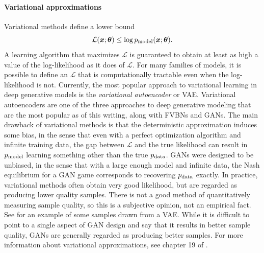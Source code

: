 \paragraph{Variational approximations}
Variational methods define a lower bound
\[ \mathcal{L}({\bm{x}}; {\bm{\theta}}) \leq \log p_{\rm{model}}({\bm{x}}; {\bm{\theta}}). \]
A learning algorithm that maximizes $\mathcal{L}$ is guaranteed to obtain at least
as high a value of the log-likelihood as it does of $\mathcal{L}$.
For many families of models, it is possible to define an $\mathcal{L}$ that is computationally
tractable even when the log-likelihood is not.
Currently, the most popular approach to variational learning in deep generative models
is the {\em variational autoencoder} \citep{Kingma-arxiv2013,Rezende-et-al-ICML2014} or VAE.
Variational autoencoders are one of the three approaches to deep generative modeling that are
the most popular as of this writing, along with FVBNs and GANs.
The main drawback of variational methods is that the deterministic approximation induces some bias,
in the sense that even with a perfect optimization algorithm and infinite training data, the gap
between $\mathcal{L}$ and the true likelihood can result in $p_{\rm{model}}$ learning something other than
the true $p_{\rm{data}}$.
GANs were designed to be unbiased, in the sense that with a large enough model and infinite data,
the Nash equilibrium for a GAN game corresponds to recovering $p_{\rm{data}}$ exactly.
In practice, variational methods often obtain very good likelihood, but are regarded as producing
lower quality samples.
There is not a good method of quantitatively measuring sample quality, so this is a subjective opinion,
not an empirical fact.
See  for an example of some samples drawn from a VAE.
While it is difficult to point to a single aspect of GAN design and say that it results in
better sample quality, GANs are generally regarded as producing better samples.
For more information about variational approximations, see chapter 19 of
\citet{Goodfellow-et-al-2016}.

